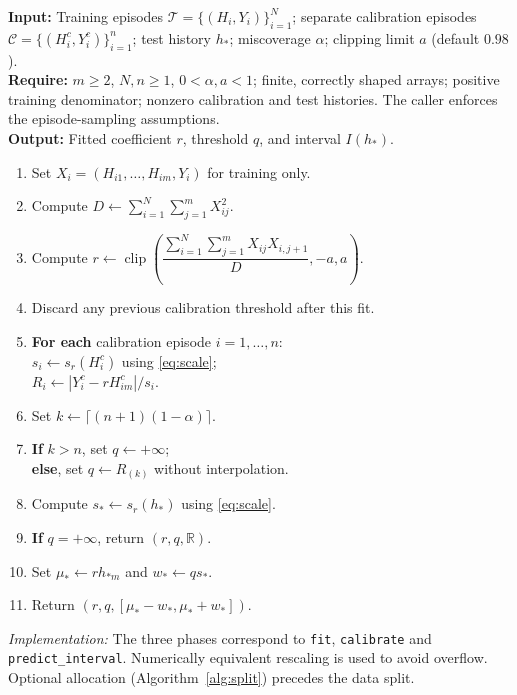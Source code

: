 \begin{algorithm}[t]
\caption{IN-ARCP: fit, calibrate, and predict}
\label{alg:inarcp}
\small
\textbf{Input:} Training episodes $\mathcal T=\{(H_i,Y_i)\}_{i=1}^N$; separate calibration episodes $\mathcal C=\{(H_i^c,Y_i^c)\}_{i=1}^n$; test history $h_*$; miscoverage $\alpha$; clipping limit $a$ (default $0.98$).\\
\textbf{Require:} $m\geq2$, $N,n\geq1$, $0<\alpha,a<1$; finite, correctly shaped arrays; positive training denominator; nonzero calibration and test histories. The caller enforces the episode-sampling assumptions.\\
\textbf{Output:} Fitted coefficient $r$, threshold $q$, and interval $I(h_*)$.
\begin{enumerate}[label=\arabic*:,leftmargin=1.7em,itemsep=3pt,topsep=5pt]
\item Set $X_i=(H_{i1},\ldots,H_{im},Y_i)$ for training only.
\item Compute $D\gets\sum_{i=1}^N\sum_{j=1}^m X_{ij}^2$.
\item Compute $r\gets\operatorname{clip}\!\left(\dfrac{\sum_{i=1}^N\sum_{j=1}^m X_{ij}X_{i,j+1}}{D},-a,a\right)$.
\item Discard any previous calibration threshold after this fit.
\item \textbf{For each} calibration episode $i=1,\ldots,n$:\\
\hspace*{.6em}$s_i\gets s_r(H_i^c)$ using \eqref{eq:scale};\\
\hspace*{.6em}$R_i\gets |Y_i^c-rH_{im}^c|/s_i$.
\item Set $k\gets\lceil(n+1)(1-\alpha)\rceil$.
\item \textbf{If} $k>n$, set $q\gets+\infty$;\\
\hspace*{.6em}\textbf{else}, set $q\gets R_{(k)}$ without interpolation.
\item Compute $s_*\gets s_r(h_*)$ using \eqref{eq:scale}.
\item \textbf{If} $q=+\infty$, return $(r,q,\mathbb R)$.
\item Set $\mu_*\gets rh_{*m}$ and $w_*\gets qs_*$.
\item Return $(r,q,[\mu_*-w_*,\mu_*+w_*])$.
\end{enumerate}
\textit{Implementation:} The three phases correspond to \texttt{fit}, \texttt{calibrate} and \texttt{predict\_interval}. Numerically equivalent rescaling is used to avoid overflow. Optional allocation (Algorithm~\ref{alg:split}) precedes the data split.
\end{algorithm}
